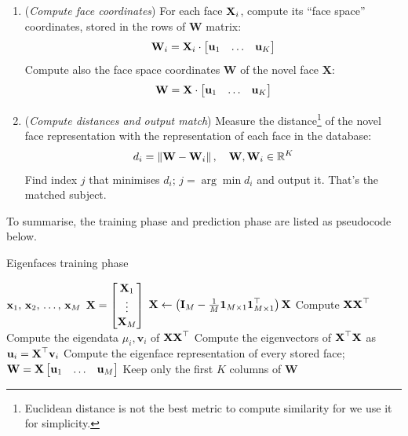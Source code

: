\documentclass[a4paper]{article}
\begin{document}
\begin{enumerate}
	\item (\textit{Compute face coordinates}) For each face $\textbf{X}_i$, compute its ``face space'' coordinates, stored in the rows of $\textbf{W}$ matrix:
\begin{equation}
	\textbf{W}_i = \textbf{X}_i \cdot \begin{bmatrix}
		\textbf{u}_1 & \ldots & \textbf{u}_K	
	\end{bmatrix}	
\end{equation}
		Compute also the face space coordinates $\textbf{W}$ of the novel face $\textbf{X}$:
\begin{equation}
	\textbf{W} = \textbf{X} \cdot \begin{bmatrix}
		\textbf{u}_1 & \ldots & \textbf{u}_K	
	\end{bmatrix}	
\end{equation}
	\item (\textit{Compute distances and output match}) Measure the distance\footnote{Euclidean distance is not the best metric to compute similarity for we use it for simplicity.} of the novel face representation with the representation of each face in the database:
		\[
			d_i = \left\lVert\textbf{W} - \textbf{W}_i\right\rVert,\quad \textbf{W}, \textbf{W}_i\in \mathbb{R}^K
		\]
Find index $j$ that minimises $d_i$; $j = \arg \min d_i$ and output it. That's the matched subject.
\end{enumerate}
To summarise, the training phase and prediction phase are listed as pseudocode below.
\begin{algorithm}[H]
\caption{Eigenfaces training phase}
\label{alg:eigenfaces_train}
\begin{algorithmic}[1]
 {$\textbf{x}_1,\, \textbf{x}_2, \, \ldots, \, \textbf{x}_M$} 
	\State  $\textbf{X} = \begin{bmatrix} 
\textbf{X}_1 \\ \vdots \\	\textbf{X}_M
\end{bmatrix}$ 
	\State $\textbf{X} \leftarrow \left(\textbf{I}_M - \frac{1}{M}\textbf{1}_{M\times 1}\textbf{1}_{M\times 1}^{\top} \right)\textbf{X}$ 
	\State Compute $\textbf{X}\textbf{X}^{\top}$
	\State Compute the eigendata $\mu_i, \textbf{v}_i$ of $\textbf{X}\textbf{X}^{\top}$
	\State Compute the eigenvectors of $\textbf{X}^{\top}\textbf{X}$ as $\textbf{u}_i=\textbf{X}^{\top}\textbf{v}_i$ 
	\State Compute the eigenface representation of every stored face; $\textbf{W} = \textbf{X} \begin{bmatrix}
		\textbf{u}_1 & \ldots & \textbf{u}_M	
	\end{bmatrix}$	
	\State Keep only the first $K$ columns of $\textbf{W}$ 
\EndProcedure
\end{algorithmic}
\end{algorithm}
\end{document}
